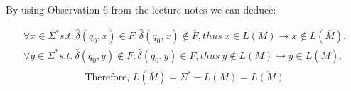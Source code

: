 
By using Observation 6 from the lecture notes we can deduce:

\begin{align*}
\forall x \in \Sigma^* s.t. \  \hat \delta (q_0,x) \in F: \hat \delta(q_0, x) \notin \overline F, thus \ x \in L(M) \rightarrow x \notin L(\overline M). \\
\forall y \in \Sigma^* s.t. \  \hat \delta (q_0, y) \notin  F: \hat \delta(q_0, y) \in \overline F, thus \ y \notin L(M) \rightarrow y \in L(\overline M). \\
\end{align*}
$$
\text{Therefore, } L(\overline M) = \Sigma^* - L(M) = \overline{L(M)}
$$
